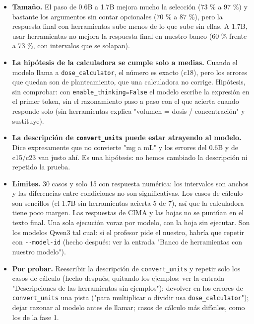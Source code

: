 \begin{itemize}
\tightlist
\item
  \textbf{Tamaño.} El paso de 0.6B a 1.7B mejora mucho la selección (73 \% a 97 \%) y bastante los
  argumentos sin contar opcionales (70 \% a 87 \%), pero la respuesta final con herramientas sube
  menos de lo que sube sin ellas. A 1.7B, usar herramientas no mejora la respuesta final en nuestro
  banco (60 \% frente a 73 \%, con intervalos que se solapan).
\item
  \textbf{La hipótesis de la calculadora se cumple solo a medias.} Cuando el modelo llama a
  \texttt{dose\_\allowbreak{}calculator}, el número es exacto (c18), pero los errores que quedan son de planteamiento,
  que una calculadora no corrige. Hipótesis, sin comprobar: con \texttt{enable\_\allowbreak{}thinking=\allowbreak{}False} el modelo
  escribe la expresión en el primer token, sin el razonamiento paso a paso con el que acierta
  cuando responde solo (sin herramientas explica "volumen = dosis / concentración" y sustituye).
\item
  \textbf{La descripción de \texttt{convert\_\allowbreak{}units} puede estar atrayendo al modelo.} Dice expresamente que no
  convierte "mg a mL" y los errores del 0.6B y de c15/c23 van justo ahí. Es una hipótesis: no
  hemos cambiado la descripción ni repetido la prueba.
\item
  \textbf{Límites.} 30 casos y solo 15 con respuesta numérica: los intervalos son anchos y las
  diferencias entre condiciones no son significativas. Los casos de cálculo son sencillos (el 1.7B
  sin herramientas acierta 5 de 7), así que la calculadora tiene poco margen. Las respuestas de
  CIMA y las hojas no se puntúan en el texto final. Una sola ejecución voraz por modelo, con la
  hoja sin ejecutar. Son los modelos Qwen3 tal cual: si el profesor pide el nuestro, habría que
  repetir con \texttt{-\/\allowbreak{}-model-id} (hecho después: ver la entrada "Banco de herramientas con nuestro
  modelo").
\item
  \textbf{Por probar.} Reescribir la descripción de \texttt{convert\_\allowbreak{}units} y repetir solo los casos
  de cálculo (hecho después, quitando los ejemplos: ver la entrada "Descripciones de las
  herramientas sin ejemplos"); devolver en los errores de \texttt{convert\_\allowbreak{}units} una pista ("para multiplicar o dividir
  usa \texttt{dose\_\allowbreak{}calculator}"); dejar razonar al modelo antes de llamar; casos de cálculo más difíciles,
  como los de la fase 1.
\end{itemize}

